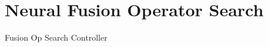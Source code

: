 \documentclass{beamer}
\begin{document}




\section{Neural Fusion Operator Search}

{%
\begin{frame}{Fusion Op Search Controller}
\centering
\hspace*{-1.0cm}
\scalebox{1.0}{%

}
\end{frame}
}

\end{document}
